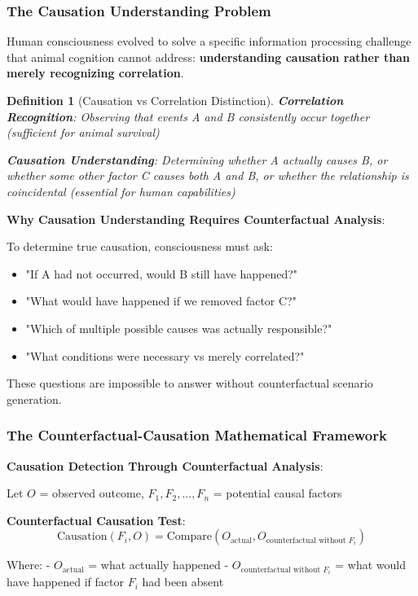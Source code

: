 \documentclass[12pt,a4paper]{article}
\newtheorem{definition}[theorem]{Definition}
\begin{document}
\subsubsection{The Causation Understanding Problem}

Human consciousness evolved to solve a specific information processing challenge that animal cognition cannot address: \textbf{understanding causation rather than merely recognizing correlation}.

\begin{definition}[Causation vs Correlation Distinction]
\textbf{Correlation Recognition}: Observing that events A and B consistently occur together (sufficient for animal survival)

\textbf{Causation Understanding}: Determining whether A actually causes B, or whether some other factor C causes both A and B, or whether the relationship is coincidental (essential for human capabilities)
\end{definition}

\textbf{Why Causation Understanding Requires Counterfactual Analysis}:

To determine true causation, consciousness must ask:
\begin{itemize}
\item "If A had not occurred, would B still have happened?"
\item "What would have happened if we removed factor C?"
\item "Which of multiple possible causes was actually responsible?"
\item "What conditions were necessary vs merely correlated?"
\end{itemize}

These questions are impossible to answer without counterfactual scenario generation.

\subsubsection{The Counterfactual-Causation Mathematical Framework}

\textbf{Causation Detection Through Counterfactual Analysis}:

Let $O$ = observed outcome, $F_1, F_2, ..., F_n$ = potential causal factors

\textbf{Counterfactual Causation Test}:
$$\text{Causation}(F_i, O) = \text{Compare}(O_{\text{actual}}, O_{\text{counterfactual without } F_i})$$

Where:
- $O_{\text{actual}}$ = what actually happened
- $O_{\text{counterfactual without } F_i}$ = what would have happened if factor $F_i$ had been absent
\end{document}
